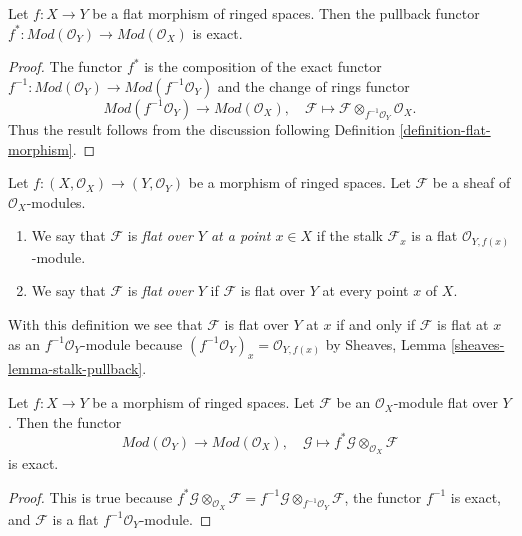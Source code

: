 \begin{lemma}
\label{lemma-pullback-flat}
Let $f : X \to Y$ be a flat morphism of ringed spaces.
Then the pullback functor
$f^* : \textit{Mod}(\mathcal{O}_Y) \to \textit{Mod}(\mathcal{O}_X)$
is exact.
\end{lemma}

\begin{proof}
The functor $f^*$ is the composition of the exact functor
$f^{-1} : \textit{Mod}(\mathcal{O}_Y) \to \textit{Mod}(f^{-1}\mathcal{O}_Y)$
and the change of rings functor
$$
\textit{Mod}(f^{-1}\mathcal{O}_Y) \to \textit{Mod}(\mathcal{O}_X), \quad
\mathcal{F} \longmapsto
\mathcal{F} \otimes_{f^{-1}\mathcal{O}_Y} \mathcal{O}_X.
$$
Thus the result follows from the discussion following
Definition \ref{definition-flat-morphism}.
\end{proof}

\begin{definition}
\label{definition-flat-module}
Let $f : (X, \mathcal{O}_X) \to (Y, \mathcal{O}_Y)$ be a morphism of
ringed spaces. Let $\mathcal{F}$ be a sheaf of $\mathcal{O}_X$-modules.
\begin{enumerate}
\item We say that $\mathcal{F}$ is {\it flat over $Y$ at a point $x \in X$}
if the stalk $\mathcal{F}_x$ is a flat $\mathcal{O}_{Y, f(x)}$-module.
\item We say that $\mathcal{F}$ is {\it flat over $Y$} if
$\mathcal{F}$ is flat over $Y$ at every point $x$ of $X$.
\end{enumerate}
\end{definition}

\noindent
With this definition we see that $\mathcal{F}$ is flat over $Y$ at $x$
if and only if $\mathcal{F}$ is flat at $x$ as an
$f^{-1}\mathcal{O}_Y$-module because
$(f^{-1}\mathcal{O}_Y)_x = \mathcal{O}_{Y, f(x)}$ by
Sheaves, Lemma \ref{sheaves-lemma-stalk-pullback}.

\begin{lemma}
\label{lemma-pullback-tensor-flat-module}
Let $f : X \to Y$ be a morphism of ringed spaces. Let $\mathcal{F}$
be an $\mathcal{O}_X$-module flat over $Y$. Then the functor
$$
\textit{Mod}(\mathcal{O}_Y) \to \textit{Mod}(\mathcal{O}_X),\quad
\mathcal{G} \longmapsto f^*\mathcal{G} \otimes_{\mathcal{O}_X} \mathcal{F}
$$
is exact.
\end{lemma}

\begin{proof}
This is true because
$f^*\mathcal{G} \otimes_{\mathcal{O}_X} \mathcal{F} =
f^{-1}\mathcal{G} \otimes_{f^{-1}\mathcal{O}_Y} \mathcal{F}$,
the functor $f^{-1}$ is exact, and $\mathcal{F}$ is a flat
$f^{-1}\mathcal{O}_Y$-module.
\end{proof}














